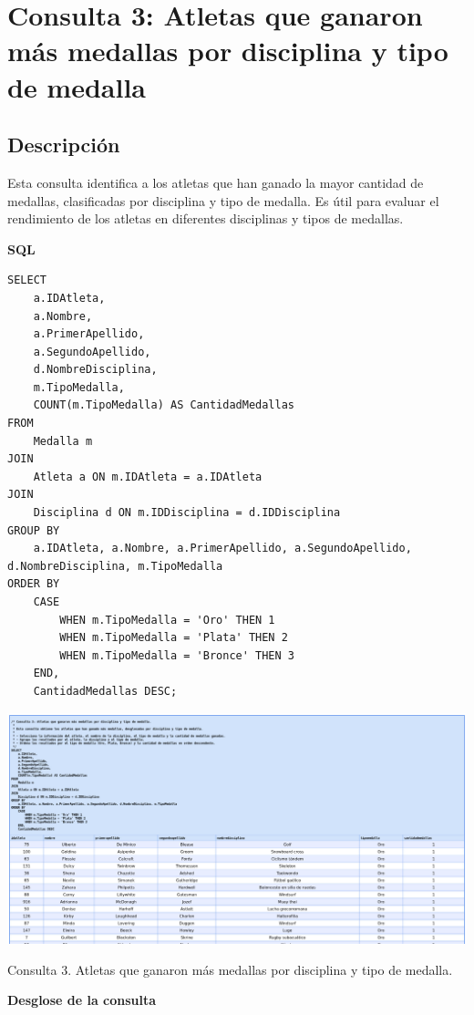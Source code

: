 \section*{Consulta 3: Atletas que ganaron más medallas por disciplina y tipo de medalla}

\subsection*{Descripción}
Esta consulta identifica a los atletas que han ganado la mayor cantidad de medallas, clasificadas por disciplina y tipo de medalla. Es útil para evaluar el rendimiento de los atletas en diferentes disciplinas y tipos de medallas.

\textbf{SQL}

\begin{verbatim}
SELECT 
    a.IDAtleta,
    a.Nombre,
    a.PrimerApellido,
    a.SegundoApellido,
    d.NombreDisciplina,
    m.TipoMedalla,
    COUNT(m.TipoMedalla) AS CantidadMedallas
FROM 
    Medalla m
JOIN 
    Atleta a ON m.IDAtleta = a.IDAtleta
JOIN 
    Disciplina d ON m.IDDisciplina = d.IDDisciplina
GROUP BY 
    a.IDAtleta, a.Nombre, a.PrimerApellido, a.SegundoApellido, d.NombreDisciplina, m.TipoMedalla
ORDER BY 
    CASE 
        WHEN m.TipoMedalla = 'Oro' THEN 1
        WHEN m.TipoMedalla = 'Plata' THEN 2
        WHEN m.TipoMedalla = 'Bronce' THEN 3
    END,
    CantidadMedallas DESC;
\end{verbatim}

\begin{center}
    \includegraphics[width=16.5cm]{resources/Chapters/Consultas/Imagenes/Consulta3.jpeg} 
    
   Consulta 3. Atletas que ganaron más medallas por disciplina y tipo de medalla.
\end{center}

\textbf{Desglose de la consulta}

